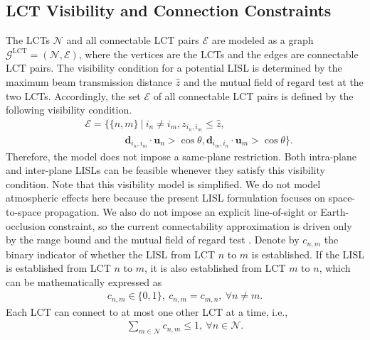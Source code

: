 \documentclass[journal]{IEEEtran}
\begin{document}
\subsection{\texorpdfstring{LCT Visibility and Connection Constraints}{LCT Visibility and Connection Constraints}}\label{subsec:lct_visibility_connection}
The LCTs $\mathcal{N}$ and all connectable LCT pairs $\mathcal{E}$ are modeled as a graph $\mathcal{G}^\text{LCT} = (\mathcal{N},\mathcal{E})$, where the vertices are the LCTs and the edges are connectable LCT pairs.
The visibility condition for a potential LISL is determined by the maximum beam transmission distance $\hat{z}$ and the mutual field of regard test at the two LCTs.
Accordingly, the set $\mathcal{E}$ of all connectable LCT pairs is defined by the following visibility condition.
\begin{equation}\label{eq:lct_visibility_condition}
  \begin{aligned}
    &\mathcal{E} = \big\{\{n,m\}\ \big| \ i_n \neq i_m, z_{i_n,i_m} \leq \hat{z}, \\
    &\qquad\qquad \mathbf{d}_{i_n,i_m} \cdot \mathbf{u}_n > \cos \theta,\mathbf{d}_{i_m,i_n} \cdot \mathbf{u}_m > \cos \theta \big\}.
  \end{aligned}
\end{equation}
Therefore, the model does not impose a same-plane restriction. Both intra-plane and inter-plane LISLs can be feasible whenever they satisfy this visibility condition.
Note that this visibility model is simplified. We do not model atmospheric effects here because the present LISL formulation focuses on space-to-space propagation. We also do not impose an explicit line-of-sight or Earth-occlusion constraint, so the current connectability approximation is driven only by the range bound and the mutual field of regard test \cite{vallado2022fundamentals,leyva-mayorga2021interplane,yang2024analysis}.
Denote by $c_{n,m}$ the binary indicator of whether the LISL from LCT $n$ to $m$ is established. If the LISL is established from LCT $n$ to $m$, it is also established from LCT $m$ to $n$, which can be mathematically expressed as
\begin{equation}\label{eq:const:link:binary_bidirectional_connection}
  \begin{aligned}
    c_{n,m}\in \{0,1\},\ c_{n,m} = c_{m,n} ,\ \forall n\neq m.
  \end{aligned}
\end{equation}
Each LCT can connect to at most one other LCT at a time, i.e.,
\begin{equation}\label{eq:const:link:one_connection}
  \begin{aligned}
    \sum_{m\in\mathcal{N}} c_{n,m} \leq 1,\ \forall n\in\mathcal{N}.
  \end{aligned}
\end{equation}
\end{document}
